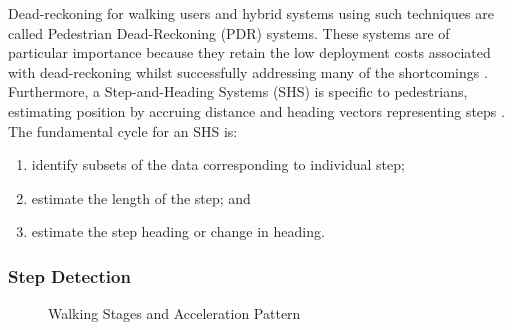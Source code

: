             Dead-reckoning for walking users and hybrid systems using such techniques are called Pedestrian Dead-Reckoning (PDR) systems. These systems are of particular importance because they retain the low deployment costs associated with dead-reckoning whilst successfully addressing many of the shortcomings \cite{harle2013PIndoor}. Furthermore,  a Step-and-Heading Systems (SHS) is specific to pedestrians, estimating position by accruing distance and heading vectors representing steps \cite{harle2013PIndoor}. The fundamental cycle for an SHS is:
            \begin{enumerate}
				\item identify subsets of the data corresponding to individual step;
                \item estimate the length of the step; and
                \item estimate the step heading or change in heading.
			\end{enumerate}
            
            \subsubsection{Step Detection}
            
            \begin{figure}[ht!]
                \centering        
                \caption{Walking Stages and Acceleration Pattern \cite{zhao2010full}}
                 \label{fig:litRev_stepMotion}
          	  \end{figure}
            
